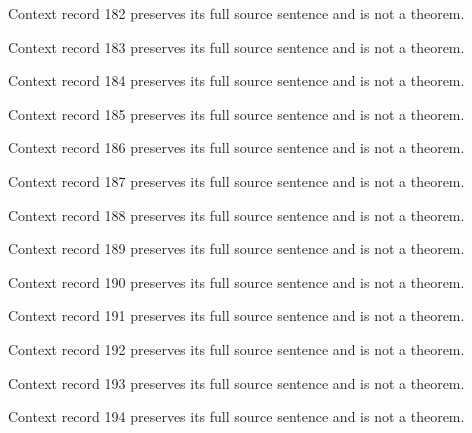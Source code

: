\documentclass{article}
\begin{document}
\begin{remark}\label{train:context:182}Context record 182 preserves its full source sentence and is not a theorem.\end{remark}
\begin{remark}\label{train:context:183}Context record 183 preserves its full source sentence and is not a theorem.\end{remark}
\begin{remark}\label{train:context:184}Context record 184 preserves its full source sentence and is not a theorem.\end{remark}
\begin{remark}\label{train:context:185}Context record 185 preserves its full source sentence and is not a theorem.\end{remark}
\begin{remark}\label{train:context:186}Context record 186 preserves its full source sentence and is not a theorem.\end{remark}
\begin{remark}\label{train:context:187}Context record 187 preserves its full source sentence and is not a theorem.\end{remark}
\begin{remark}\label{train:context:188}Context record 188 preserves its full source sentence and is not a theorem.\end{remark}
\begin{remark}\label{train:context:189}Context record 189 preserves its full source sentence and is not a theorem.\end{remark}
\begin{remark}\label{train:context:190}Context record 190 preserves its full source sentence and is not a theorem.\end{remark}
\begin{remark}\label{train:context:191}Context record 191 preserves its full source sentence and is not a theorem.\end{remark}
\begin{remark}\label{train:context:192}Context record 192 preserves its full source sentence and is not a theorem.\end{remark}
\begin{remark}\label{train:context:193}Context record 193 preserves its full source sentence and is not a theorem.\end{remark}
\begin{remark}\label{train:context:194}Context record 194 preserves its full source sentence and is not a theorem.\end{remark}
\end{document}

